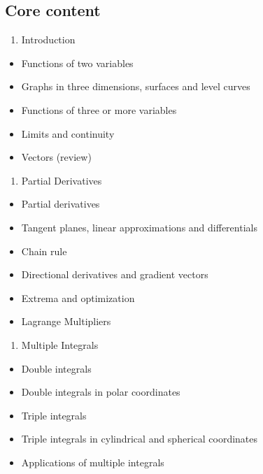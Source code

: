 \documentclass[
]{article}
\providecommand{\tightlist}{%
  \setlength{\itemsep}{0pt}\setlength{\parskip}{0pt}}
\begin{document}
\hypertarget{core-content}{%
\subsection*{Core content}\label{core-content}}

\begin{enumerate}
\def\labelenumi{\arabic{enumi}.}
\tightlist
\item
  Introduction
\end{enumerate}

\begin{itemize}
\tightlist
\item
  Functions of two variables
\item
  Graphs in three dimensions, surfaces and level curves
\item
  Functions of three or more variables
\item
  Limits and continuity
\item
  Vectors (review)
\end{itemize}

\begin{enumerate}
\def\labelenumi{\arabic{enumi}.}
\setcounter{enumi}{1}
\tightlist
\item
  Partial Derivatives
\end{enumerate}

\begin{itemize}
\tightlist
\item
  Partial derivatives
\item
  Tangent planes, linear approximations and differentials
\item
  Chain rule
\item
  Directional derivatives and gradient vectors
\item
  Extrema and optimization
\item
  Lagrange Multipliers
\end{itemize}

\begin{enumerate}
\def\labelenumi{\arabic{enumi}.}
\setcounter{enumi}{2}
\tightlist
\item
  Multiple Integrals
\end{enumerate}

\begin{itemize}
\tightlist
\item
  Double integrals
\item
  Double integrals in polar coordinates
\item
  Triple integrals
\item
  Triple integrals in cylindrical and spherical coordinates
\item
  Applications of multiple integrals
\end{itemize}
\end{document}
